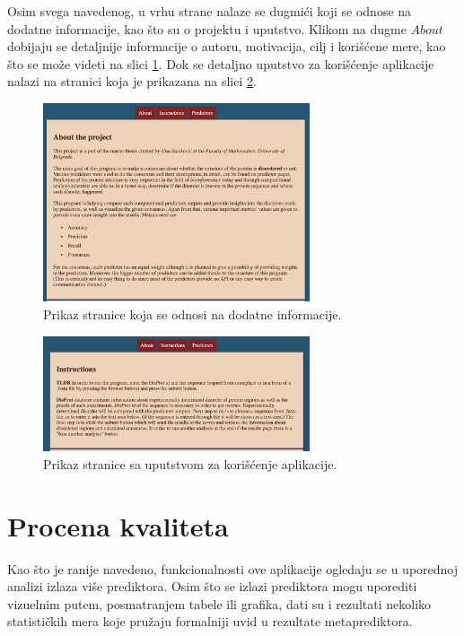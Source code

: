 Osim svega navedenog, u vrhu strane nalaze se dugmići koji se odnose na dodatne informacije, kao što su o projektu i uputstvo. Klikom na dugme $About$ dobijaju se detaljnije informacije o autoru, motivacija, cilj i korišćene mere, kao što se može videti na slici \ref{fig:about}. Dok se detaljno uputstvo za korišćenje aplikacije nalazi na stranici koja je prikazana na slici  \ref{fig:instr}.
\begin{figure}[H]
	\centering
    \includegraphics[width=0.7\textwidth]{Figures/App/about.png}
    \caption{Prikaz stranice koja se odnosi na dodatne informacije.}
    \label{fig:about}
\end{figure}
\begin{figure}[H]
	\centering
    \includegraphics[width=0.7\textwidth]{Figures/App/instructions.png}
    \caption{Prikaz stranice sa uputstvom za korišćenje aplikacije.}
    \label{fig:instr}
\end{figure}

\section{Procena kvaliteta}
Kao što je ranije navedeno, funkcionalnosti ove aplikacije ogledaju se u uporednoj analizi izlaza više prediktora. Osim što se izlazi prediktora mogu uporediti vizuelnim putem, posmatranjem tabele ili grafika, dati su i rezultati nekoliko statističkih mera koje pružaju formalniji uvid u rezultate metaprediktora. 

